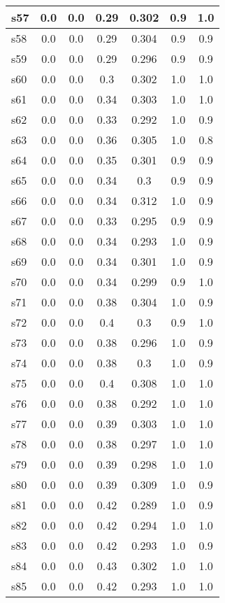 \documentclass{article}
\begin{document}
\begin{tabular}{|l|c|c|c|c|c|c|}
\hline
s57 &0.0 & 0.0 & 0.29 & 0.302 & 0.9 & 1.0\\
\hline
s58 &0.0 & 0.0 & 0.29 & 0.304 & 0.9 & 0.9\\
\hline
s59 &0.0 & 0.0 & 0.29 & 0.296 & 0.9 & 0.9\\
\hline
s60 &0.0 & 0.0 & 0.3 & 0.302 & 1.0 & 1.0\\
\hline
s61 &0.0 & 0.0 & 0.34 & 0.303 & 1.0 & 1.0\\
\hline
s62 &0.0 & 0.0 & 0.33 & 0.292 & 1.0 & 0.9\\
\hline
s63 &0.0 & 0.0 & 0.36 & 0.305 & 1.0 & 0.8\\
\hline
s64 &0.0 & 0.0 & 0.35 & 0.301 & 0.9 & 0.9\\
\hline
s65 &0.0 & 0.0 & 0.34 & 0.3 & 0.9 & 0.9\\
\hline
s66 &0.0 & 0.0 & 0.34 & 0.312 & 1.0 & 0.9\\
\hline
s67 &0.0 & 0.0 & 0.33 & 0.295 & 0.9 & 0.9\\
\hline
s68 &0.0 & 0.0 & 0.34 & 0.293 & 1.0 & 0.9\\
\hline
s69 &0.0 & 0.0 & 0.34 & 0.301 & 1.0 & 0.9\\
\hline
s70 &0.0 & 0.0 & 0.34 & 0.299 & 0.9 & 1.0\\
\hline
s71 &0.0 & 0.0 & 0.38 & 0.304 & 1.0 & 0.9\\
\hline
s72 &0.0 & 0.0 & 0.4 & 0.3 & 0.9 & 1.0\\
\hline
s73 &0.0 & 0.0 & 0.38 & 0.296 & 1.0 & 0.9\\
\hline
s74 &0.0 & 0.0 & 0.38 & 0.3 & 1.0 & 0.9\\
\hline
s75 &0.0 & 0.0 & 0.4 & 0.308 & 1.0 & 1.0\\
\hline
s76 &0.0 & 0.0 & 0.38 & 0.292 & 1.0 & 1.0\\
\hline
s77 &0.0 & 0.0 & 0.39 & 0.303 & 1.0 & 1.0\\
\hline
s78 &0.0 & 0.0 & 0.38 & 0.297 & 1.0 & 1.0\\
\hline
s79 &0.0 & 0.0 & 0.39 & 0.298 & 1.0 & 1.0\\
\hline
s80 &0.0 & 0.0 & 0.39 & 0.309 & 1.0 & 0.9\\
\hline
s81 &0.0 & 0.0 & 0.42 & 0.289 & 1.0 & 0.9\\
\hline
s82 &0.0 & 0.0 & 0.42 & 0.294 & 1.0 & 1.0\\
\hline
s83 &0.0 & 0.0 & 0.42 & 0.293 & 1.0 & 0.9\\
\hline
s84 &0.0 & 0.0 & 0.43 & 0.302 & 1.0 & 1.0\\
\hline
s85 &0.0 & 0.0 & 0.42 & 0.293 & 1.0 & 1.0\\

\end{tabular}
\end{document}
